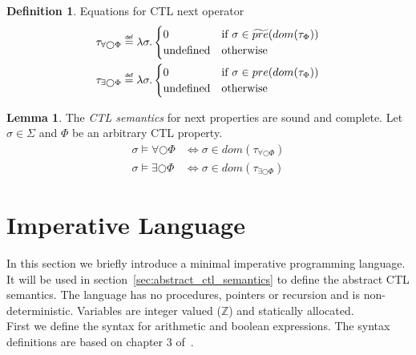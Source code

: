 \documentclass[11pt,a4paper,titlepage]{article}
\theoremstyle{definition}
\newtheorem{definition}{Definition}[section]
\newtheorem{lemma}[theorem]{Lemma}
\newcommand\eqdef{\mathrel{\overset{\makebox[0pt]{\mbox{\normalfont\tiny\sffamily def}}}{=}}}
\begin{document}
\begin{definition}\label{def:ctl_semantics_next}
    Equations for CTL next operator
    \setlength{\jot}{15pt}
    \begin{align}
        \tau_{\forall\bigcirc\Phi} &\eqdef \lambda \sigma.
        \begin{cases}
            0                   & \text{if} \ \sigma \in \widetilde{pre}(dom(\tau_\Phi)) \\
            \text{undefined}    & \text{otherwise}
        \end{cases}\\
        \tau_{\exists\bigcirc\Phi} &\eqdef \lambda \sigma.
        \begin{cases}
            0                   & \text{if} \ \sigma \in pre(dom(\tau_\Phi)) \\
            \text{undefined}    & \text{otherwise}
        \end{cases}
    \end{align}
\end{definition}

\begin{lemma}\label{lem:ctl_semantics_next}
    The \textit{CTL semantics} for \textsf{next} properties are sound and complete. 
    Let $\sigma \in \Sigma$ and $\Phi$ be an arbitrary CTL property.
    \begin{align}
        \sigma \models \forall\bigcirc\Phi &\iff \sigma \in dom(\tau_{\forall\bigcirc\Phi})\\
        \sigma \models \exists\bigcirc\Phi &\iff \sigma \in dom(\tau_{\exists\bigcirc\Phi})
    \end{align}
\end{lemma}


\section{Imperative Language}\label{sec:imperative_language}

In this section we briefly introduce a minimal imperative programming language. 
It will be used in section~\ref{sec:abstract_ctl_semantics} to define the abstract CTL semantics.
The language has no procedures, pointers or recursion and is non-deterministic.
Variables are integer valued ($\mathbb{Z}$) and statically allocated.\\

First we define the syntax for arithmetic and boolean expressions. 
The syntax definitions are based on chapter 3 of~\cite{UrbanPhd}.
\end{document}
